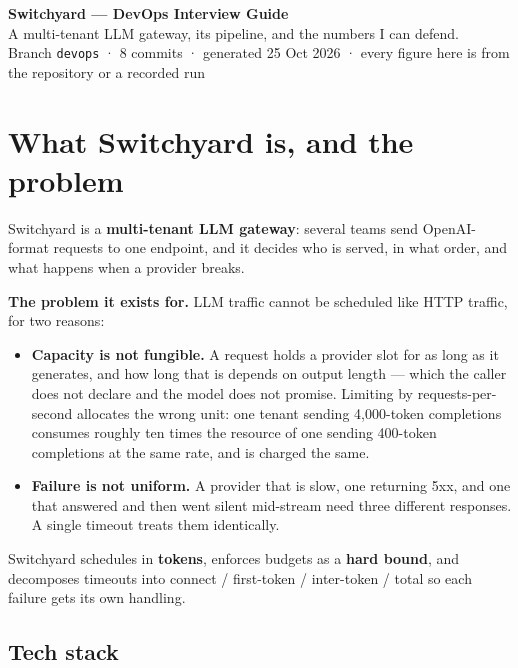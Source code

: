 \documentclass[10pt,a4paper]{article}
\begin{document}
\begin{center}
  {\LARGE\bfseries Switchyard — DevOps Interview Guide}\\[2pt]
  {\small A multi-tenant LLM gateway, its pipeline, and the numbers I can defend.}\\[2pt]
  {\footnotesize Branch \texttt{devops} · 8 commits · generated 25 Oct 2026 ·
   every figure here is from the repository or a recorded run}
\end{center}

\vspace{-4pt}
\section{What Switchyard is, and the problem}

Switchyard is a \textbf{multi-tenant LLM gateway}: several teams send
OpenAI-format requests to one endpoint, and it decides who is served, in what
order, and what happens when a provider breaks.

\textbf{The problem it exists for.} LLM traffic cannot be scheduled like HTTP
traffic, for two reasons:

\begin{itemize}
\item \textbf{Capacity is not fungible.} A request holds a provider slot for as
  long as it generates, and how long that is depends on output length — which
  the caller does not declare and the model does not promise. Limiting by
  requests-per-second allocates the wrong unit: one tenant sending 4{,}000-token
  completions consumes roughly ten times the resource of one sending 400-token
  completions at the same rate, and is charged the same.
\item \textbf{Failure is not uniform.} A provider that is slow, one returning
  5xx, and one that answered and then went silent mid-stream need three
  different responses. A single timeout treats them identically.
\end{itemize}

Switchyard schedules in \textbf{tokens}, enforces budgets as a \textbf{hard
bound}, and decomposes timeouts into connect / first-token / inter-token /
total so each failure gets its own handling.

\subsection{Tech stack}
\end{document}
